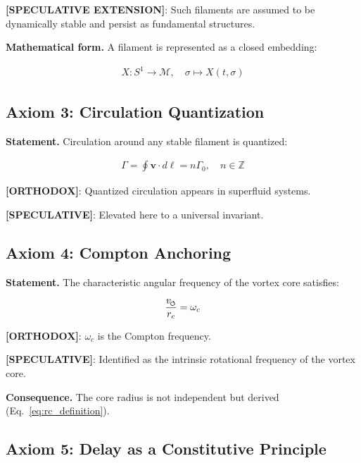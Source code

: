         \textbf{[SPECULATIVE EXTENSION]}: Such filaments are assumed to be dynamically stable and persist as fundamental structures.
        
        \textbf{Mathematical form.}
        A filament is represented as a closed embedding:
        
        \begin{align}
            X: S^1 \to \mathcal{M}, \quad \sigma \mapsto X(t,\sigma)
        \end{align}
    
    \subsection{Axiom 3: Circulation Quantization}
        
        \textbf{Statement.}
        Circulation around any stable filament is quantized:
        
        \begin{align}
            \Gamma = \oint \mathbf{v} \cdot d\ell = n \Gamma_0, \quad n \in \mathbb{Z}
        \end{align}
        
        \textbf{[ORTHODOX]}: Quantized circulation appears in superfluid systems.
        
        \textbf{[SPECULATIVE]}: Elevated here to a universal invariant.
    
    \subsection{Axiom 4: Compton Anchoring}
        
        \textbf{Statement.}
        The characteristic angular frequency of the vortex core satisfies:
        
        \begin{align}
            \frac{v_{\swirlarrow}}{r_c} = \omega_c
        \end{align}
        
        \textbf{[ORTHODOX]}: $\omega_c$ is the Compton frequency.
        
        \textbf{[SPECULATIVE]}: Identified as the intrinsic rotational frequency of the vortex core.
        
        \textbf{Consequence.}
        The core radius is not independent but derived (Eq.~\ref{eq:rc_definition}).
    
    \subsection{Axiom 5: Delay as a Constitutive Principle}
        
